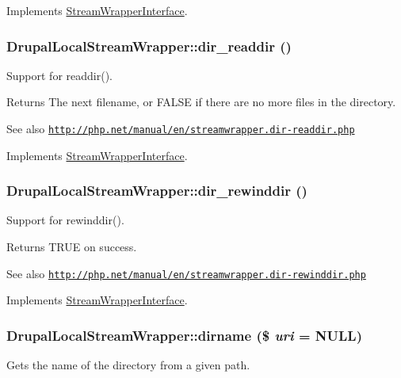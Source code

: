 Implements \hyperlink{interfaceStreamWrapperInterface}{StreamWrapperInterface}.\hypertarget{classDrupalLocalStreamWrapper_a9f36b143a44f64e25962b67a9c16fb8c}{
\subsubsection[{dir\_\-readdir}]{\setlength{\rightskip}{0pt plus 5cm}DrupalLocalStreamWrapper::dir\_\-readdir ()}}
\label{classDrupalLocalStreamWrapper_a9f36b143a44f64e25962b67a9c16fb8c}
Support for readdir().

\begin{DoxyReturn}{Returns}
The next filename, or FALSE if there are no more files in the directory.
\end{DoxyReturn}
\begin{DoxySeeAlso}{See also}
\href{http://php.net/manual/en/streamwrapper.dir-readdir.php}{\tt http://php.net/manual/en/streamwrapper.dir-\/readdir.php} 
\end{DoxySeeAlso}


Implements \hyperlink{interfaceStreamWrapperInterface}{StreamWrapperInterface}.\hypertarget{classDrupalLocalStreamWrapper_a0136ec99b77e9443c1013f0162cb45bb}{
\subsubsection[{dir\_\-rewinddir}]{\setlength{\rightskip}{0pt plus 5cm}DrupalLocalStreamWrapper::dir\_\-rewinddir ()}}
\label{classDrupalLocalStreamWrapper_a0136ec99b77e9443c1013f0162cb45bb}
Support for rewinddir().

\begin{DoxyReturn}{Returns}
TRUE on success.
\end{DoxyReturn}
\begin{DoxySeeAlso}{See also}
\href{http://php.net/manual/en/streamwrapper.dir-rewinddir.php}{\tt http://php.net/manual/en/streamwrapper.dir-\/rewinddir.php} 
\end{DoxySeeAlso}


Implements \hyperlink{interfaceStreamWrapperInterface}{StreamWrapperInterface}.\hypertarget{classDrupalLocalStreamWrapper_ab98ad39ce1745a24c760abf3e4297577}{
\subsubsection[{dirname}]{\setlength{\rightskip}{0pt plus 5cm}DrupalLocalStreamWrapper::dirname (\$ {\em uri} = {\ttfamily NULL})}}
\label{classDrupalLocalStreamWrapper_ab98ad39ce1745a24c760abf3e4297577}
Gets the name of the directory from a given path.

